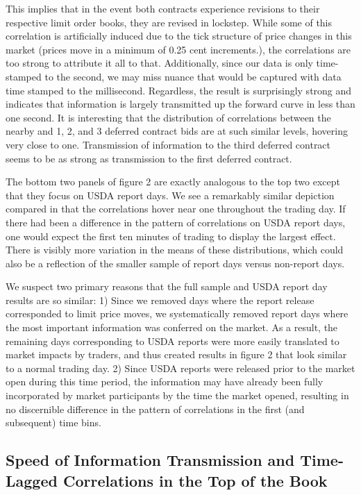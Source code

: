 \documentclass[review,12pt]{elsarticle}
\begin{document}
This implies that in the event both contracts experience revisions to
their respective limit order books, they are revised in lockstep. While
some of this correlation is artificially induced due to the tick
structure of price changes in this market (prices move in a minimum of
0.25 cent increments.), the correlations are too strong to attribute it
all to that. Additionally, since our data is only time-stamped to the
second, we may miss nuance that would be captured with data time stamped
to the millisecond. Regardless, the result is surprisingly strong and
indicates that information is largely transmitted up the forward curve
in less than one second. It is interesting that the distribution of
correlations between the nearby and 1, 2, and 3 deferred contract bids
are at such similar levels, hovering very close to one. Transmission of
information to the third deferred contract seems to be as strong as
transmission to the first deferred contract.

The bottom two panels of figure 2 are exactly analogous to the top two
except that they focus on USDA report days. We see a remarkably similar
depiction compared in that the correlations hover near one throughout
the trading day. If there had been a difference in the pattern of
correlations on USDA report days, one would expect the first ten minutes
of trading to display the largest effect. There is visibly more
variation in the means of these distributions, which could also be a
reflection of the smaller sample of report days versus non-report days.

We suspect two primary reasons that the full sample and USDA report day
results are so similar: 1) Since we removed days where the report
release corresponded to limit price moves, we systematically removed
report days where the most important information was conferred on the
market. As a result, the remaining days corresponding to USDA reports
were more easily translated to market impacts by traders, and thus
created results in figure 2 that look similar to a normal trading day.
2) Since USDA reports were released prior to the market open during this
time period, the information may have already been fully incorporated by
market participants by the time the market opened, resulting in no
discernible difference in the pattern of correlations in the first (and
subsequent) time bins.

\subsection{Speed of Information Transmission and Time-Lagged
Correlations in the Top of the
Book}\label{speed-of-information-transmission-and-time-lagged-correlations-in-the-top-of-the-book-1}
\end{document}
